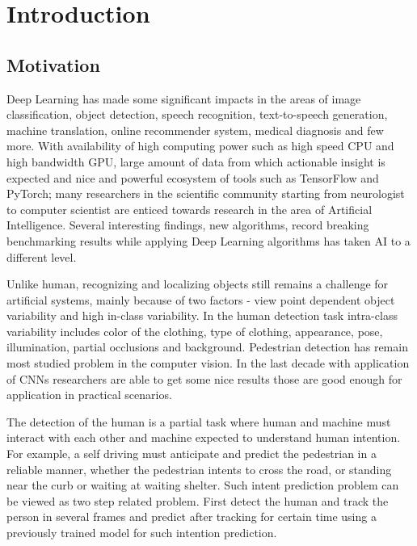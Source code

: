 \chapter{Introduction}
\section{Motivation}
Deep Learning has made some significant impacts in the areas of image classification, 
object detection, speech recognition, text-to-speech generation, machine translation,
online recommender system, medical diagnosis and few more. With availability of high 
computing power such as high speed CPU and high bandwidth GPU, large amount of 
data from which actionable insight is expected and nice and powerful ecosystem of  
tools such as TensorFlow and PyTorch; many researchers in the scientific community 
starting from neurologist to computer scientist are enticed towards research in the area 
of Artificial Intelligence. Several interesting findings, new algorithms, record 
breaking benchmarking results while applying Deep Learning algorithms has taken 
AI to a different level.

\vspace{1em}
\noindent Unlike human, recognizing and localizing objects still remains a challenge for artificial 
systems, mainly because of two factors - view point dependent object variability and
high in-class variability. In the human detection task intra-class variability includes
color of the clothing, type of clothing, appearance, pose, illumination, partial occlusions
and background. Pedestrian detection has remain most studied problem in the computer vision.
In the last decade with application of CNNs researchers are able to get some nice results 
those are good enough for application in practical scenarios.

\vspace{1em}
\noindent The detection of the human is a partial task where human and machine must interact 
with each other and machine expected to understand human intention. For example, 
a self driving must anticipate and predict the pedestrian in a reliable manner, whether 
the pedestrian intents to cross the road, or standing near the curb or waiting at waiting shelter.
Such intent prediction problem can be viewed as two step related problem. First detect the 
human and track the person in several frames and predict after tracking for certain time using a 
previously trained model for such intention prediction.

